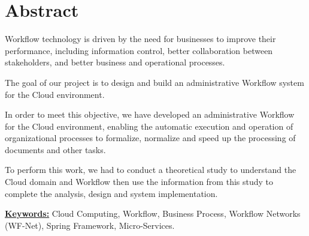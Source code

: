 \chapter*{Abstract}
\large
Workflow technology is driven by the need for businesses to improve their performance, including information control, better collaboration between stakeholders, and better business and operational processes.

The goal of our project is to design and build an administrative Workflow system for the Cloud environment.


In order to meet this objective, we have developed an administrative Workflow for the Cloud environment, enabling the automatic execution and operation of organizational processes to formalize, normalize and speed up the processing of documents and other tasks.

To perform this work, we had to conduct a theoretical study to understand the Cloud domain and Workflow then use the information from this study to complete the analysis, design and system implementation.


\textbf{\underline{Keywords:}} Cloud Computing, Workflow, Business Process, Workflow Networks (WF-Net), Spring Framework, Micro-Services.
 
 \normalsize